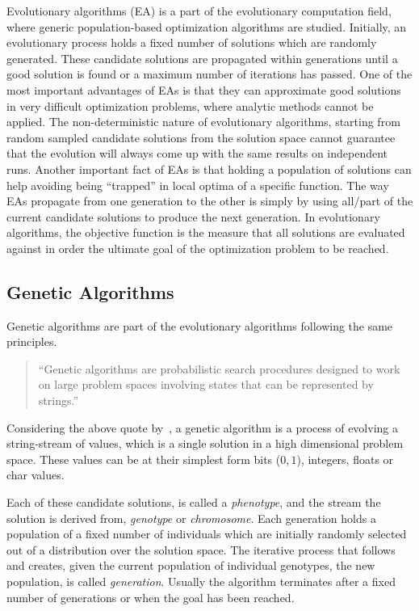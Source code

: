 Evolutionary algorithms (EA) is a part of the evolutionary computation field, where generic population-based optimization algorithms are studied. Initially, an evolutionary process holds a fixed number of solutions which are randomly generated. These candidate solutions are propagated within generations until a good solution is found or a maximum number of iterations has passed. One of the most important advantages of EAs is that they can approximate good solutions in very difficult optimization problems, where analytic methods cannot be applied. The non-deterministic nature of evolutionary algorithms, starting from random sampled candidate solutions from the solution space cannot guarantee that the evolution will always come up with the same results on independent runs. Another important fact of EAs is that holding a population of solutions can help avoiding being ``trapped'' in local optima of a specific function. The way EAs propagate from one generation to the other is simply by using all/part of the current candidate solutions to produce the next generation. In evolutionary algorithms, the objective function is the measure that all solutions are evaluated against in order the ultimate goal of the optimization problem to be reached.




\subsection{Genetic Algorithms}
\label{geneticAlgorithms}
Genetic algorithms are part of the evolutionary algorithms following the same principles.

\begin{quote}``Genetic algorithms are probabilistic search procedures designed to work on
large problem spaces involving states that can be represented by strings.''\end{quote}

Considering the above quote by~\citep{goldberg1988genetic}, a genetic algorithm is a process of evolving a string-stream of values, which is a single solution in a high dimensional problem space. These values can be at their simplest form bits ($0, 1$), integers, floats or char values.

Each of these candidate solutions, is called a \emph{phenotype}, and the stream the solution is derived from, \emph{genotype} or \emph{chromosome}. Each generation holds a population of a fixed number of individuals which are initially randomly selected out of a distribution over the solution space. The iterative process that follows and creates, given the current population of individual genotypes, the new population, is called \emph{generation}. Usually the algorithm terminates after a fixed number of generations or when the goal has been reached. 

